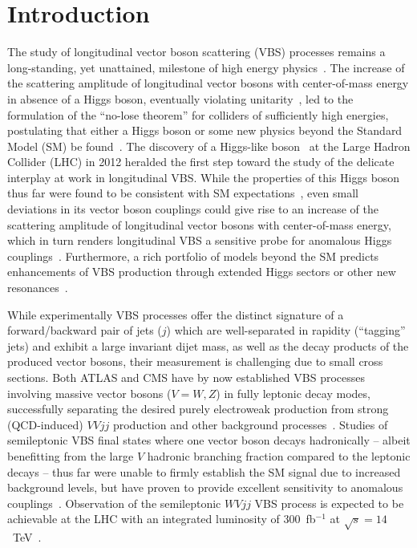 \documentclass[amsmath,amssymb,aps,prd,preprint,groupedaddress]{revtex4-2}
\begin{document}
\section{Introduction}
\label{sec:introduction}
The study of longitudinal vector boson scattering (VBS) processes remains a 
long-standing, yet unattained, milestone of high energy physics~\cite{Dicus:1990fz}.
The increase of the  scattering amplitude of longitudinal vector bosons with 
center-of-mass energy in absence of a Higgs boson, eventually violating 
unitarity~\cite{Veltman:1976rt,Lee:1977yc,Lee:1977eg}, led to the formulation
of the ``no-lose theorem'' for colliders of sufficiently high energies, postulating
that either a Higgs boson or some new physics beyond the Standard Model (SM)
be found~\cite{Gunion:1989we}. 
The discovery of a Higgs-like boson~\cite{Aad:2012tfa, Chatrchyan:2012ufa}
at the Large Hadron Collider (LHC) in 2012 heralded the first step toward
the study of the delicate interplay at work in longitudinal VBS. While the properties
of this Higgs boson thus far were found to be consistent with SM 
expectations~\cite{Khachatryan:2014kca, Khachatryan:2014jba,Aad:2015mxa,Aad:2015gba},
even small deviations in its vector boson couplings could give rise to an
increase of the scattering amplitude of longitudinal vector bosons with center-of-mass energy,
which in turn renders longitudinal VBS a sensitive probe for anomalous Higgs
couplings~\cite{Eboli:2006wa,Campbell:2015vwa}. Furthermore, a rich portfolio
of models beyond the SM predicts enhancements of VBS production through
extended Higgs sectors or other new resonances~\cite{Alboteanu:2008my,Godfrey:2010qb,
Espriu:2012ih,Chang:2013aya,Chiang:2014bia,Kilian:2014zja}. 

While experimentally VBS processes offer the distinct signature of a forward/backward pair of jets ($j$) which 
are well-separated in rapidity (``tagging'' jets) and exhibit a large invariant dijet mass, as well as the decay products of the
produced vector bosons, their measurement is challenging due to small cross sections.  Both ATLAS
and CMS have by now established VBS processes involving massive vector bosons ($V = W, Z$) in fully leptonic 
decay modes, successfully separating the desired purely electroweak production from strong (QCD-induced) $VVjj$ 
production and other background processes~\cite{Aaboud:2018ddq,Sirunyan:2020gyx,Aaboud:2019nmv,Sirunyan:2017ret,
Aad:2020zbq,Sirunyan:2020alo}. Studies of semileptonic VBS final states where one vector boson decays hadronically -- albeit 
benefitting from the large $V$ hadronic branching fraction compared to the leptonic decays -- thus far were unable to firmly 
establish the SM signal due to increased background levels, but have proven to provide excellent sensitivity to anomalous 
couplings~\cite{Aaboud:2016uuk,Sirunyan:2019der,Aad:2019xxo}. Observation of the semileptonic $W V jj$ VBS process is expected to 
be achievable at the LHC with an integrated luminosity of 300~fb$^{-1}$ at $\sqrt{s} = 14$~TeV~\cite{ATLAS:2018ocj}.
\end{document}
